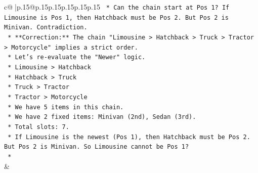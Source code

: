 \documentclass{article}
\begin{document}
{\begin{supertabular}{c@{$\;$}|p{.15\linewidth}@{}p{.15\linewidth}p{.15\linewidth}p{.15\linewidth}p{.15\linewidth}p{.15\linewidth}}
{{{\texttt{    *   Can the chain start at Pos 1? If Limousine is Pos 1, then Hatchback must be Pos 2. But Pos 2 is Minivan. Contradiction.} \\
\texttt{    *   **Correction:** The chain "Limousine > Hatchback > Truck > Tractor > Motorcycle" implies a strict order.} \\
\texttt{    *   Let's re{-}evaluate the "Newer" logic.} \\
\texttt{        *   Limousine > Hatchback} \\
\texttt{        *   Hatchback > Truck} \\
\texttt{        *   Truck > Tractor} \\
\texttt{        *   Tractor > Motorcycle} \\
\texttt{    *   We have 5 items in this chain.} \\
\texttt{    *   We have 2 fixed items: Minivan (2nd), Sedan (3rd).} \\
\texttt{    *   Total slots: 7.} \\
\texttt{    *   If Limousine is the newest (Pos 1), then Hatchback must be Pos 2. But Pos 2 is Minivan. So Limousine cannot be Pos 1?} \\
\texttt{    *} \\
            }
        }
    }
    & \\ \\

\end{supertabular}
}
\end{document}
